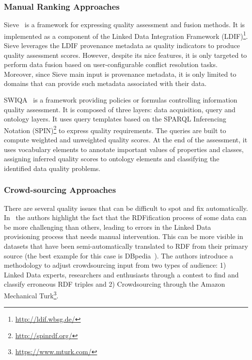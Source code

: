 \subsubsection{Manual Ranking Approaches}
Sieve~\cite{Mendes:EDBT:12} is a framework for expressing quality assessment and fusion methods. It is implemented as a component of the Linked Data Integration Framework (LDIF)\footnote{\url{http://ldif.wbsg.de/}}. Sieve leverages the LDIF provenance metadata as quality indicators to produce quality assessment scores. However, despite its nice features, it is only targeted to perform data fusion based on user-configurable conflict resolution tasks. Moreover, since Sieve main input is provenance metadata, it is only limited to domains that can provide such metadata associated with their data.

SWIQA~\cite{Furber:ECIS:11} is a framework providing policies or formulas controlling information quality assessment. It is composed of three layers: data acquisition, query and ontology layers. It uses query templates based on the SPARQL Inferencing Notation (SPIN)\footnote{\url{http://spinrdf.org/}} to express quality requirements. The queries are built to compute weighted and unweighted quality scores. At the end of the assessment, it uses vocabulary elements to annotate important values of properties and classes, assigning inferred quality scores to ontology elements and classifying the identified data quality problems.

\subsubsection{Crowd-sourcing Approaches}
There are several quality issues that can be difficult to spot and fix automatically. In~\cite{Acosta:ISWC:13} the authors highlight the fact that the RDFification process of some data can be more challenging than others, leading to errors in the Linked Data provisioning process that needs manual intervention. This can be more visible in datasets that have been semi-automatically translated to RDF from their primary source (the best example for this case is DBpedia~\cite{Bizer:WebSemJorunal:09}). The authors introduce a methodology to adjust crowdsourcing input from two types of audience: 1) Linked Data experts, researchers and enthusiasts through a contest to find and classify erroneous RDF triples and 2) Crowdsourcing through the Amazon Mechanical Turk\footnote{\url{https://www.mturk.com/}}.

